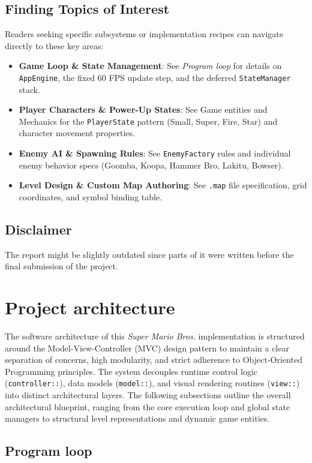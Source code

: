 \documentclass[12pt, a4paper]{article}
\begin{document}
\subsection*{Finding Topics of Interest}
Readers seeking specific subsystems or implementation recipes can navigate directly to these key areas:
\begin{itemize}
\item \textbf{Game Loop \& State Management}: See \textit{Program loop} for details on \texttt{AppEngine}, the fixed 60 FPS update step, and the deferred \texttt{StateManager} stack.
\item \textbf{Player Characters \& Power-Up States}: See Game entities and Mechanics for the \texttt{PlayerState} pattern (Small, Super, Fire, Star) and character movement properties.
\item \textbf{Enemy AI \& Spawning Rules}: See \texttt{EnemyFactory} rules and individual enemy behavior specs (Goomba, Koopa, Hammer Bro, Lakitu, Bowser).
\item \textbf{Level Design \& Custom Map Authoring}: See \texttt{.map} file specification, grid coordinates, and symbol binding table.
\end{itemize}

\subsection*{Disclaimer}
The report might be slightly outdated since parts of it were written before the final submission of the project.

\newpage

\section{Project architecture}

The software architecture of this \textit{Super Mario Bros.} implementation is structured around the Model-View-Controller (MVC) design pattern to maintain a clear separation of concerns, high modularity, and strict adherence to Object-Oriented Programming principles. The system decouples runtime control logic (\texttt{controller::}), data models (\texttt{model::}), and visual rendering routines (\texttt{view::}) into distinct architectural layers. The following subsections outline the overall architectural blueprint, ranging from the core execution loop and global state managers to structural level representations and dynamic game entities.

\subsection{Program loop}
\end{document}
